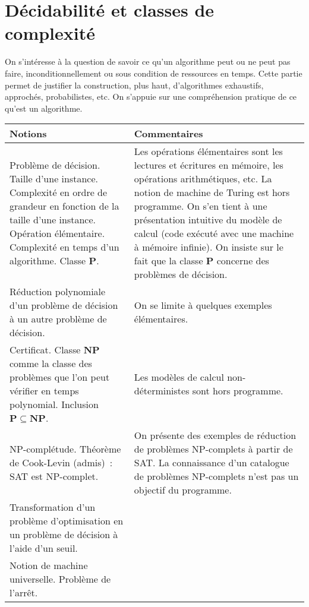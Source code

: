 
\section{Décidabilité et classes de complexité \semTroisQuatre}
On s'intéresse à la question de savoir ce qu'un algorithme peut ou ne peut pas faire, inconditionnellement ou sous condition de ressources en temps. Cette partie permet de justifier la construction, plus haut, d'algorithmes exhaustifs, approchés, probabilistes, etc. On s'appuie sur une compréhension pratique de ce qu'est un algorithme.

\noindent
\begin{longtable}{|p{\lnotion}|p{\comment}|}
    \hline
    \textbf{Notions} & \textbf{Commentaires} \\
    \hline \hline
    Problème de décision. Taille d'une instance. Complexité en ordre de grandeur en fonction de la taille d'une instance. Opération élémentaire. Complexité en temps d'un algorithme. Classe $\mathbf{P}$.
    &
    Les opérations élémentaires sont les lectures et écritures en mémoire, les opérations arithmétiques, etc. La notion de machine de Turing est hors programme. On s'en tient à une présentation intuitive du modèle de calcul (code exécuté avec une machine à mémoire infinie). On insiste sur le fait que la classe $\mathbf{P}$ concerne des problèmes de décision.
    \\
    \hline
    Réduction polynomiale d'un problème de décision à un autre problème de décision.
    &
    On se limite à quelques exemples élémentaires.
    \\
    \hline
    Certificat. Classe $\mathbf{NP}$ comme la classe des problèmes que l'on peut vérifier en temps polynomial. Inclusion $\mathbf{P} \subseteq \mathbf{NP}$.
    &
    Les modèles de calcul non-déterministes sont hors programme.
    \\
    \hline
    NP-complétude. Théorème de Cook-Levin (admis)~: SAT est NP-complet.
    &
    On présente des exemples de réduction de problèmes NP-complets à partir de SAT. La connaissance d'un catalogue de problèmes NP-complets n'est pas un objectif du programme.
    \\
    \hline
    Transformation d'un problème d'optimisation en un problème de décision à l'aide d'un seuil. &
    \\
    \hline
    Notion de machine universelle. Problème de l'arrêt. 
    & %

\end{longtable}
